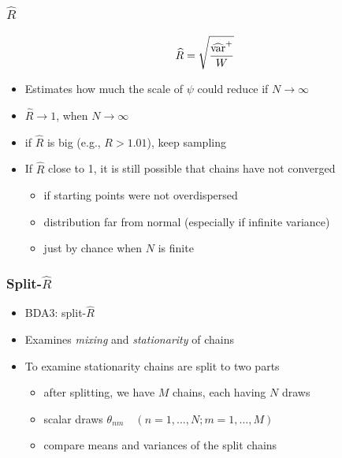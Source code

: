 \documentclass[10pt]{beamer}
\begin{document}
\begin{frame}

\frametitle{ $\widehat{R}$}

  \begin{equation*}
      \widehat{R}=\sqrt{\frac{\widehat{\mathrm{var}}^{+}}{W}}
    \end{equation*}
    \begin{itemize}
    \item<1-> Estimates how much the scale of $\psi$ could reduce if $N\rightarrow\infty$
    \item<1-> $\widehat{R}\rightarrow 1$, when $N\rightarrow\infty$
    \item<1-> if $\widehat{R}$ is big (e.g., $R>1.01$), keep sampling
    \item<2-> If $\widehat{R}$ close to 1, it is still possible that chains have not converged
      \begin{itemize}
      \item if starting points were not overdispersed
      \item distribution far from normal (especially if infinite variance)
      \item just by chance when $N$ is finite
      \end{itemize}
    \end{itemize}

\end{frame}

\begin{frame}[fragile]

\frametitle{ Split-$\widehat{R}$}

  \begin{itemize}
  \item BDA3: split-$\widehat{R}$
  \item Examines {\it mixing} and {\it stationarity} of chains
  \item To examine stationarity chains are split to two parts
    \begin{itemize}
    \item after splitting, we have $M$ chains, each having $N$ draws
    \item scalar draws $\theta_{nm} \quad (n=1,\ldots,N;m=1,\ldots,M)$
    \item compare means and variances of the split chains
    \end{itemize}
  \end{itemize}

\end{frame}
\end{document}
